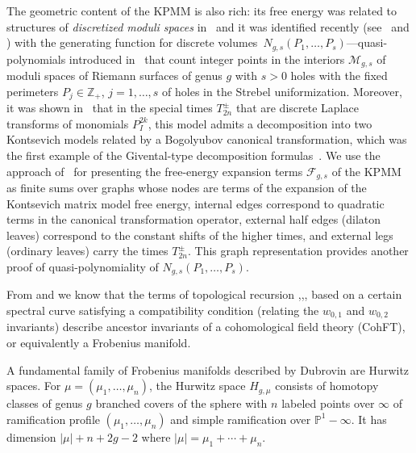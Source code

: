 \documentclass[11pt]{article}
\newcommand{\bp}{\mathbb{P}}
\theoremstyle{plain}
\theoremstyle{definition}
\newcommand {\dvol}{discrete volumes}%
\begin{document}
The geometric content of the KPMM is also rich: its free energy was related to structures of {\em discretized moduli spaces} in~\cite{Ch93} and it was identified recently (see~\cite{NorStr} and \cite{Mulase-Penkawa}) with the generating function for \dvol\ 
$N_{g,s}(P_1,\dots,P_s)$---quasi-polynomials introduced in~\cite{Norbury} that
count integer points in the interiors ${\mathcal M}_{g,s}$ of moduli spaces of Riemann surfaces of genus $g$ with $s>0$ holes with the
fixed perimeters $P_j\in{\mathbb Z}_+$, $j=1,\dots,s$ of holes in the Strebel uniformization.
Moreover, it was shown in~\cite{Ch95} that in the special times $T^{\pm}_{2n}$ that are discrete Laplace transforms of monomials
$P_I^{2k}$, this model admits a decomposition into two Kontsevich models related by a Bogolyubov canonical
transformation, which was the first example of the Givental-type
decomposition formulas~\cite{Giv}. We use the approach of~\cite{Ch95}  for presenting the
free-energy expansion terms ${\mathcal F}_{g,s}$ of the KPMM as finite sums over graphs whose nodes are
terms of the expansion of the Kontsevich
matrix model free energy, internal edges correspond to quadratic terms in the canonical transformation operator, external
half edges (dilaton leaves) correspond to the constant shifts of the higher times, and external legs
(ordinary leaves) carry the times $T^{\pm}_{2n}$.
This graph representation provides another proof of quasi-polynomiality of $N_{g,s}(P_1,\dots,P_s)$.

From \cite{Ey11} and \cite{DOSSIde} we know that the terms of topological recursion \cite{Ey},\cite{ChEy},\cite{CEO},\cite{AlMM} 
based on a certain
spectral curve satisfying a compatibility condition (relating the $w_{0,1}$ and $w_{0,2}$ invariants) describe ancestor invariants of a cohomological field theory (CohFT), or equivalently a Frobenius manifold.

A fundamental family of Frobenius manifolds described by Dubrovin are Hurwitz spaces.  For $\mu=(\mu_1,\dots,\mu_n)$, 
the Hurwitz space $H_{g,\mu}$  consists of homotopy classes of
genus $g$ branched covers of the sphere with $n$ labeled points over $\infty$ of ramification profile $(\mu_1,\dots,\mu_n)$ and simple ramification over $\bp^1-\infty$.  It has dimension $|\mu|+n+2g-2$ where $|\mu|=\mu_1+\cdots+\mu_n$.
\end{document}

